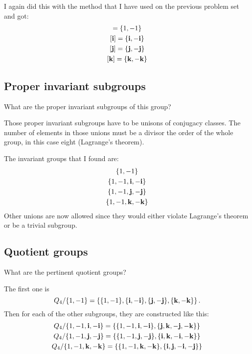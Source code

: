 \documentclass[11pt, english, fleqn, DIV=15, headinclude, BCOR=1cm]{scrartcl}
\begin{document}
I again did this with the method that I have used on the previous problem set
and got:
\begin{gather*}
    [1] = \{ 1, -1 \} \\
    [\qi] = \{ \qi, -\qi \} \\
    [\qj] = \{ \qj, -\qj \} \\
    [\qk] = \{ \qk, -\qk \}
\end{gather*}

\subsection{Proper invariant subgroups}

\begin{problem}
    What are the proper invariant subgroups of this group?
\end{problem}

Those proper invariant subgroups have to be unisons of conjugacy classes. The
number of elements in those unions must be a divisor the order of the whole
group, in this case eight (Lagrange's theorem).

The invariant groups that I found are:
\begin{gather*}
    \{ 1, -1 \} \\
    \{ 1, -1, \mathbf i, -\mathbf i \} \\
    \{ 1, -1, \mathbf j, -\mathbf j \} \\
    \{ 1, -1, \mathbf k, -\mathbf k \}
\end{gather*}
Other unions are now allowed since they would either violate Lagrange's theorem
or be a trivial subgroup.

\subsection{Quotient groups}

\begin{problem}
    What are the pertinent quotient groups?
\end{problem}

The first one is
\[
    Q_4 / \{ 1, -1 \}
    = \left\{
        \{ 1, -1 \},
        \{ \mathbf i, -\mathbf i \},
        \{ \mathbf j, -\mathbf j \},
        \{ \mathbf k, -\mathbf k \}
    \right\}.
\]
Then for each of the other subgroups, they are constructed like this:
\begin{gather*}
    Q_4 / \{ 1, -1, \mathbf i, -\mathbf i \}
    = \left\{
        \{ 1, -1, \mathbf i, -\mathbf i \},
        \{ \mathbf j, \mathbf k, -\mathbf j, -\mathbf k \}
    \right\} \\
    Q_4 / \{ 1, -1, \mathbf j, -\mathbf j \}
    = \left\{
        \{ 1, -1, \mathbf j, -\mathbf j \},
        \{ \mathbf i, \mathbf k, -\mathbf i, -\mathbf k \}
    \right\} \\
    Q_4 / \{ 1, -1, \mathbf k, -\mathbf k \}
    = \left\{
        \{ 1, -1, \mathbf k, -\mathbf k \},
        \{ \mathbf i, \mathbf j, -\mathbf i, -\mathbf j \}
    \right\}
\end{gather*}
\end{document}
